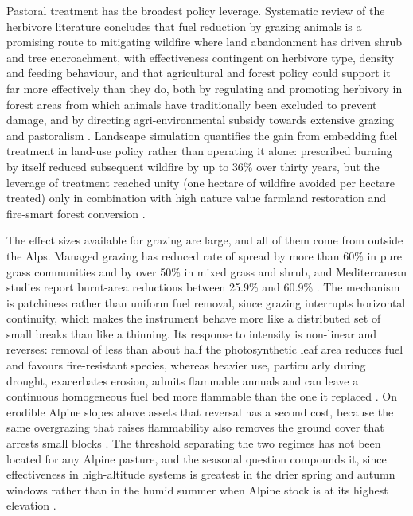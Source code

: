 \documentclass[11pt,a4paper]{article}
\begin{document}
Pastoral treatment has the broadest policy leverage. Systematic review of the herbivore literature concludes that fuel reduction by grazing animals is a promising route to mitigating wildfire where land abandonment has driven shrub and tree encroachment, with effectiveness contingent on herbivore type, density and feeding behaviour, and that agricultural and forest policy could support it far more effectively than they do, both by regulating and promoting herbivory in forest areas from which animals have traditionally been excluded to prevent damage, and by directing agri-environmental subsidy towards extensive grazing and pastoralism \citep{rouetleduc_effects_2021}. Landscape simulation quantifies the gain from embedding fuel treatment in land-use policy rather than operating it alone: prescribed burning by itself reduced subsequent wildfire by up to 36\% over thirty years, but the leverage of treatment reached unity (one hectare of wildfire avoided per hectare treated) only in combination with high nature value farmland restoration and fire-smart forest conversion \citep{pais_optimizing_2023}.

The effect sizes available for grazing are large, and all of them come from outside the Alps. Managed grazing has reduced rate of spread by more than 60\% in pure grass communities and by over 50\% in mixed grass and shrub, and Mediterranean studies report burnt-area reductions between 25.9\% and 60.9\% \citep{xu_how_2026}. The mechanism is patchiness rather than uniform fuel removal, since grazing interrupts horizontal continuity, which makes the instrument behave more like a distributed set of small breaks than like a thinning. Its response to intensity is non-linear and reverses: removal of less than about half the photosynthetic leaf area reduces fuel and favours fire-resistant species, whereas heavier use, particularly during drought, exacerbates erosion, admits flammable annuals and can leave a continuous homogeneous fuel bed more flammable than the one it replaced \citep{xu_how_2026}. On erodible Alpine slopes above assets that reversal has a second cost, because the same overgrazing that raises flammability also removes the ground cover that arrests small blocks \citep{asteriou_assessing_2025}. The threshold separating the two regimes has not been located for any Alpine pasture, and the seasonal question compounds it, since effectiveness in high-altitude systems is greatest in the drier spring and autumn windows rather than in the humid summer when Alpine stock is at its highest elevation \citep{xu_how_2026}.
\end{document}
